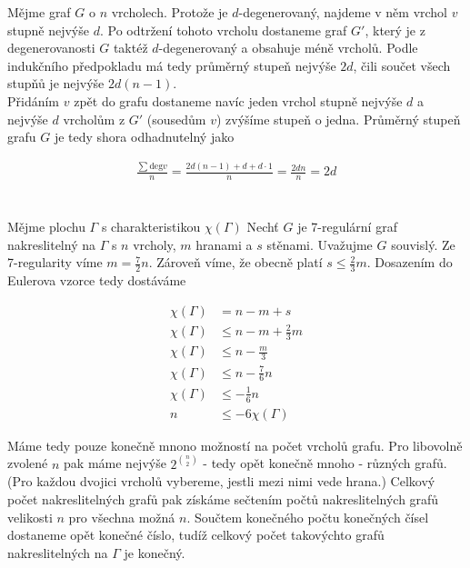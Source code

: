 \documentclass{scrartcl}
\begin{document}
    Mějme graf $G$ o $n$ vrcholech. Protože je $d$-degenerovaný, najdeme v něm vrchol $v$ stupně nejvýše $d$. Po odtržení tohoto vrcholu dostaneme graf $G'$, který je z degenerovanosti $G$ taktéž $d$-degenerovaný a obsahuje méně vrcholů. Podle indukčního předpokladu má tedy průměrný stupeň nejvýše $2d$, čili součet všech stupňů je nejvýše $2d(n-1)$. \\
    
    Přidáním $v$ zpět do grafu dostaneme navíc jeden vrchol stupně nejvýše $d$ a nejvýše $d$ vrcholům z $G'$ (sousedům $v$) zvýšíme stupeň o jedna. Průměrný stupeň grafu $G$ je tedy shora odhadnutelný jako

    \begin{align*}
        \frac{\sum \text{deg} v}{n} = \frac{2d(n-1) + d + d \cdot 1}{n} = \frac{2dn}{n} = 2d
    \end{align*}

    \section{}
    Mějme plochu $\Gamma$ s charakteristikou $\chi (\Gamma)$
    Nechť $G$ je 7-regulární graf nakreslitelný na $\Gamma$ s $n$ vrcholy, $m$ hranami a $s$ stěnami. Uvažujme $G$ souvislý. Ze 7-regularity víme $m = \frac{7}{2}n$. Zároveň víme, že obecně platí $s \leq \frac{2}{3}m$. Dosazením do Eulerova vzorce tedy dostáváme
    
    \begin{align*}
        \chi (\Gamma) &= n - m + s \\
        \chi (\Gamma) &\leq n - m + \frac{2}{3}m \\
        \chi (\Gamma) &\leq n - \frac{m}{3} \\
        \chi (\Gamma) &\leq n - \frac{7}{6}n \\
        \chi (\Gamma) &\leq -\frac{1}{6}n \\
                    n &\leq -6 \chi (\Gamma)
    \end{align*}

    Máme tedy pouze konečně mnono možností na počet vrcholů grafu. Pro libovolně zvolené $n$ pak máme nejvýše $2^{\binom{n}{2}}$ - tedy opět konečně mnoho - různých grafů. (Pro každou dvojici vrcholů vybereme, jestli mezi nimi vede hrana.) Celkový počet nakreslitelných grafů pak získáme sečtením počtů nakreslitelných grafů velikosti $n$ pro všechna možná $n$. Součtem konečného počtu konečných čísel dostaneme opět konečné číslo, tudíž celkový počet takovýchto grafů nakreslitelných na $\Gamma$ je konečný.\\
\end{document}
